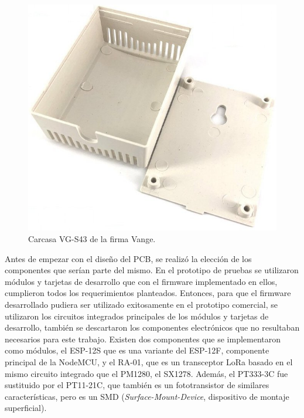 \begin{figure}[h]
	\centering
	\includegraphics[scale=0.32]{./Figures/case.jpg}
	\caption{Carcasa VG-S43 de la firma Vange\protect\footnotemark.}
		\label{fig:case}
\end{figure}


Antes de empezar con el diseño del PCB, se realizó la elección de los componentes que serían parte del mismo. En el prototipo de pruebas se utilizaron módulos y tarjetas de desarrollo que con el firmware implementado en ellos, cumplieron todos los requerimientos planteados. Entonces, para que el firmware desarrollado pudiera ser utilizado exitosamente en el prototipo comercial, se utilizaron los circuitos integrados principales de los módulos y tarjetas de desarrollo, también se descartaron los componentes electrónicos que no resultaban necesarios para este trabajo. Existen dos componentes que se implementaron como módulos, el ESP-12S que es una variante del ESP-12F, componente principal de la NodeMCU, y el RA-01, que es un transceptor LoRa basado en el mismo circuito integrado que el PM1280, el SX1278. Además, el PT333-3C fue sustituido por el PT11-21C, que también es un fototransistor de similares características, pero es un SMD (\textit{Surface-Mount-Device}, dispositivo de montaje superficial).

